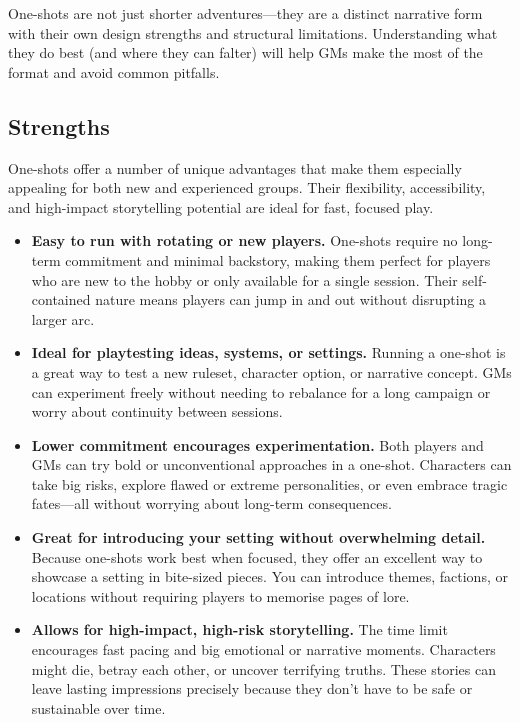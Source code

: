 One-shots are not just shorter adventures—they are a distinct narrative form with their own design strengths and structural limitations. Understanding what they do best (and where they can falter) will help GMs make the most of the format and avoid common pitfalls.

\subsection*{Strengths}

One-shots offer a number of unique advantages that make them especially appealing for both new and experienced groups. Their flexibility, accessibility, and high-impact storytelling potential are ideal for fast, focused play.

\begin{itemize}
    \item \textbf{Easy to run with rotating or new players.}  
    One-shots require no long-term commitment and minimal backstory, making them perfect for players who are new to the hobby or only available for a single session. Their self-contained nature means players can jump in and out without disrupting a larger arc.

    \item \textbf{Ideal for playtesting ideas, systems, or settings.}  
    Running a one-shot is a great way to test a new ruleset, character option, or narrative concept. GMs can experiment freely without needing to rebalance for a long campaign or worry about continuity between sessions.

    \item \textbf{Lower commitment encourages experimentation.}  
    Both players and GMs can try bold or unconventional approaches in a one-shot. Characters can take big risks, explore flawed or extreme personalities, or even embrace tragic fates—all without worrying about long-term consequences.

    \item \textbf{Great for introducing your setting without overwhelming detail.}  
    Because one-shots work best when focused, they offer an excellent way to showcase a setting in bite-sized pieces. You can introduce themes, factions, or locations without requiring players to memorise pages of lore.

    \item \textbf{Allows for high-impact, high-risk storytelling.}  
    The time limit encourages fast pacing and big emotional or narrative moments. Characters might die, betray each other, or uncover terrifying truths. These stories can leave lasting impressions precisely because they don't have to be safe or sustainable over time.
\end{itemize}

